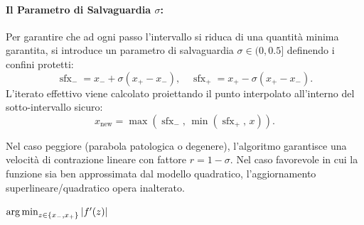 \paragraph{Il Parametro di Salvaguardia $\sigma$:}
Per garantire che ad ogni passo l'intervallo si riduca di una quantit\`a minima garantita, si introduce un parametro di salvaguardia $\sigma \in (0, 0.5]$ definendo i confini protetti:
\begin{equation}
    \operatorname{sfx}_- = x_- + \sigma (x_+ - x_-), \quad \operatorname{sfx}_+ = x_+ - \sigma (x_+ - x_-).
    \label{eq:safeguard-bounds}
\end{equation}
L'iterato effettivo viene calcolato proiettando il punto interpolato all'interno del sotto-intervallo sicuro:
\begin{equation}
    x_{\text{new}} = \max\left( \operatorname{sfx}_-, \, \min(\operatorname{sfx}_+, \, x) \right).
    \label{eq:safeguard-projection}
\end{equation}
\begin{property}
Nel caso peggiore (parabola patologica o degenere), l'algoritmo garantisce una velocit\`a di contrazione lineare con fattore $r = 1 - \sigma$. Nel caso favorevole in cui la funzione sia ben approssimata dal modello quadratico, l'aggiornamento superlineare/quadratico opera inalterato.
\end{property}

\begin{algorithm}[htbp]
\caption{Ricerca Dicotomica con Interpolazione Quadratica e Salvaguardia ($\sigma$-DIS)}
\label{alg:safeguarded-dichotomic-interpolation}
\KwInput{Funzione $f$, estremi di bracket $[x_-, x_+]$ con $f'(x_-) \le 0 \le f'(x_+)$, tolleranze $\varepsilon, \delta > 0$, parametro $\sigma \in (0, 0.5]$}
\BlankLine
{}
\Return $\operatorname*{arg\,min}_{z \in \{x_-, x_+\}} |f'(z)|$\;
\end{algorithm}

